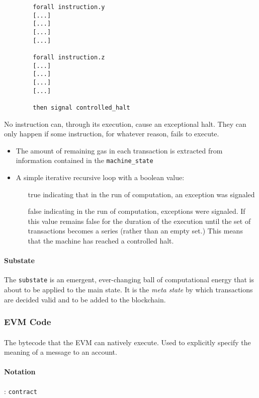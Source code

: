 \documentclass[10pt,a4paper,leqno,bibliography=totoc]{scrartcl}
\newenvironment{alphafootnotes}
{\par\edef\savedfootnotenumber{\number\value{footnote}}
\renewcommand{\thefootnote}{\alph{footnote}}
\setcounter{footnote}{0}}
{\par\setcounter{footnote}{\savedfootnotenumber}}
\begin{document}
\begin{alphafootnotes}
\begin{multicols*}{2}
\begin{verbatim}
		forall instruction.y 
		[...]
		[...]
		[...]
		[...]
		
		forall instruction.z 
		[...]
		[...]
		[...]
		[...]
		
		then signal controlled_halt
		\end{verbatim}
		
		No instruction can, through its execution, cause an exceptional halt. They can only happen if some instruction, for whatever reason, fails to execute.
		
		\begin{itemize}
			\item The amount of remaining gas in each transaction is extracted from information contained in the \texttt{machine\_state} 
			\item A simple iterative recursive  loop\supercite{Wood2017} with a boolean  value: 
		\begin{itemize}
				\item[true] indicating that in the run of computation, an exception was signaled
				\item[false] indicating in the run of computation, exceptions were signaled. If this value remains false for the duration of the execution until the set of transactions becomes a series (rather than an empty set.) This means that the machine has reached a controlled halt. 
			\end{itemize}
		\end{itemize}
    	
				\paragraph{Substate}
					The \texttt{substate} is an emergent, ever-changing ball of computational energy that is about to be applied to the main state. It is the \textit{meta state} by which transactions are decided valid and to be added to the blockchain.
		
			\subsubsection{EVM Code}
				\paragraph{}The bytecode that the EVM can natively execute. Used to explicitly specify the meaning of a message to an account.
				\paragraph{Notation}: \texttt{contract}

\end{multicols*}
\end{alphafootnotes}
\end{document}

